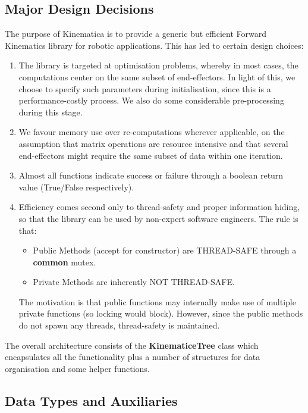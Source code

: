 \documentclass[12pt,a4paper,onecolumn]{article}
\begin{document}
\subsection{Major Design Decisions}
The purpose of Kinematica is to provide a generic but efficient Forward Kinematics library for robotic applications. This has led to certain design choices:
\begin{enumerate}
\item The library is targeted at optimisation problems, whereby in most cases, the computations center on the same subset of end-effectors. In light of this, we choose to specify such parameters during initialisation, since this is a performance-costly process. We also do some considerable pre-processing during this stage.
\item We favour memory use over re-computations wherever applicable, on the assumption that matrix operations are resource intensive and that several end-effectors might require the same subset of data within one iteration.
\item Almost all functions indicate success or failure through a boolean return value (True/False respectively).
\item Efficiency comes second only to thread-safety and proper information hiding, so that the library can be used by non-expert software engineers. The rule is that:
\begin{itemize}
\item Public Methods (accept for constructor) are THREAD-SAFE through a \textbf{common} mutex.
\item Private Methods are inherently NOT THREAD-SAFE.
\end{itemize}The motivation is that public functions may internally make use of multiple private functions (so locking would block). However, since the public methods do not spawn any threads, thread-safety is maintained.
\end{enumerate}
The overall architecture consists of the \textbf{KinematiceTree} class which encapsulates all the functionality plus a number of structures for data organisation and some helper functions.

\subsection{Data Types and Auxiliaries}
\end{document}
